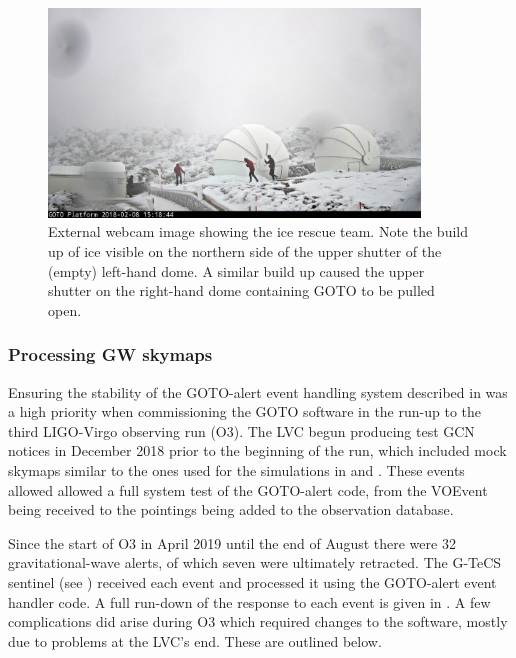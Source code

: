 \begin{colsection}
\begin{colsection}
\begin{figure}[p]
    \begin{center}
    \includegraphics[width=0.88\textwidth]{images/ice_outside.jpeg}
    \end{center}
    \caption[External webcam image showing the ice rescue team]{
        External webcam image showing the ice rescue team. Note the build up of ice visible on the northern side of the upper shutter of the (empty) left-hand dome. A similar build up caused the upper shutter on the right-hand dome containing GOTO to be pulled open.
    }\label{fig:ice_external}
\end{figure}

\clearpage

\subsubsection{Processing GW skymaps}

Ensuring the stability of the GOTO-alert event handling system described in  was a high priority when commissioning the GOTO software in the run-up to the third LIGO-Virgo observing run (O3). The LVC begun producing test GCN notices in December 2018 prior to the beginning of the run, which included mock skymaps similar to the ones used for the simulations in  and . These events allowed allowed a full system test of the GOTO-alert code, from the VOEvent being received to the pointings being added to the observation database.

Since the start of O3 in April 2019 until the end of August there were 32 gravitational-wave alerts, of which seven were ultimately retracted. The G-TeCS sentinel (see ) received each event and processed it using the GOTO-alert event handler code. A full run-down of the response to each event is given in . A few complications did arise during O3 which required changes to the software, mostly due to problems at the LVC's end. These are outlined below.


\end{colsection}
\end{colsection}
